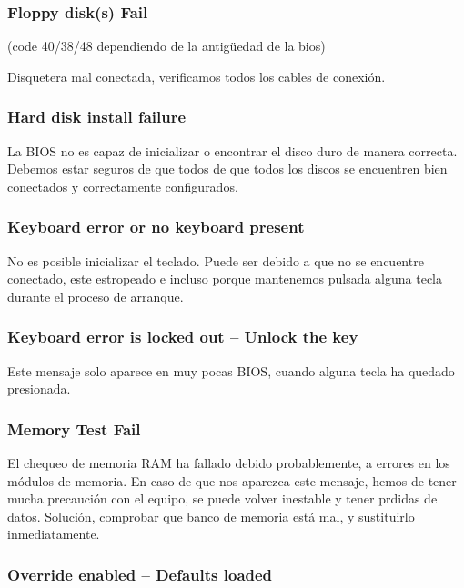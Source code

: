 \documentclass[12pt,oneside,a4paper]{article}
\begin{document}
		\subsubsection{Floppy disk(s) Fail} 
		
		(code 40/38/48 dependiendo de la antigüedad de la bios)

		Disquetera mal conectada, verificamos todos los cables de conexión.

		\subsubsection{Hard disk install failure}

		La BIOS no es capaz de inicializar o encontrar el disco duro de
		manera correcta. Debemos estar seguros de que todos de que todos
		los discos se encuentren bien conectados y correctamente
		configurados.

		\subsubsection{Keyboard error or no keyboard present}

		No es posible inicializar el teclado. Puede ser debido a que no se
		encuentre conectado, este estropeado e incluso porque mantenemos
		pulsada alguna tecla durante el proceso de arranque.

		\subsubsection{Keyboard error is locked out – Unlock the key}

		Este mensaje solo aparece en muy pocas BIOS, cuando alguna tecla ha
		quedado presionada. 

		\subsubsection{Memory Test Fail}

		El chequeo de memoria RAM ha fallado debido probablemente, a
		errores en los módulos de memoria. En caso de que nos aparezca este
		mensaje, hemos de tener mucha precaución con el equipo, se puede
		volver inestable y tener prdidas de datos. Solución, comprobar que
		banco de memoria está mal, y sustituirlo inmediatamente. 

		\subsubsection{Override enabled – Defaults loaded}
\end{document}
